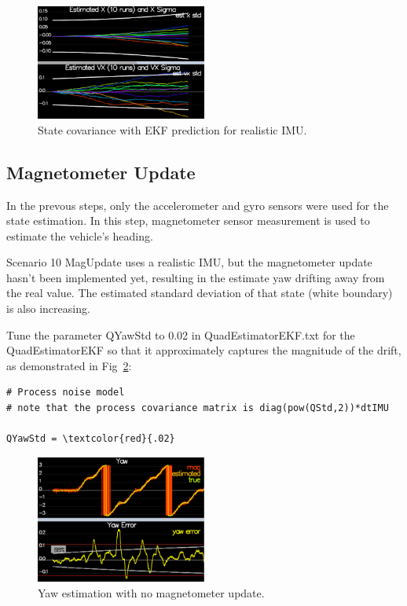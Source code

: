 \documentclass[letterpaper]{article}
\begin{document}
\begin{figure}[ht]
\centering
\includegraphics[width=0.5\textwidth]{./images/scenario9_2.png}
\caption{\label{fig:real_imu_ekf} State covariance with EKF prediction for realistic IMU.}
\end{figure}

\subsection{Magnetometer Update}

In the prevous steps, only the accelerometer and gyro sensors were used for the state estimation. In this step, magnetometer sensor measurement is used to estimate the vehicle's heading.

Scenario 10 MagUpdate uses a realistic IMU, but the magnetometer update hasn’t been implemented yet, resulting in the estimate yaw drifting away from the real value. The estimated standard deviation of that state (white boundary) is also increasing. 

Tune the parameter QYawStd to 0.02 in QuadEstimatorEKF.txt for the QuadEstimatorEKF so that it approximately captures the magnitude of the drift, as demonstrated in Fig~\ref{fig:magnetometer}:

\begin{Verbatim}[frame=single, commandchars=\\\{\}]
# Process noise model
# note that the process covariance matrix is diag(pow(QStd,2))*dtIMU

QYawStd = \textcolor{red}{.02}
\end{Verbatim}

\begin{figure}[ht]
\centering
\includegraphics[width=0.5\textwidth]{./images/scenario10_1.png}
\caption{\label{fig:magnetometer} Yaw estimation with no magnetometer update.}
\end{figure}
\end{document}
